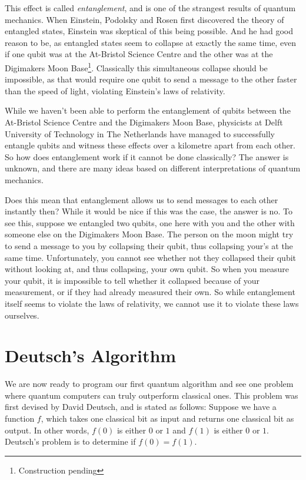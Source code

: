 \documentclass[twocolumn]{article}
\begin{document}
This effect is called {\em entanglement}, and is one of the strangest results of quantum mechanics. When Einstein, Podolsky and Rosen first discovered the theory of entangled states, Einstein was skeptical of this being possible. And he had good reason to be, as entangled states seem to collapse at exactly the same time, even if one qubit was at the At-Bristol Science Centre and the other was at the Digimakers Moon Base\footnote{Construction pending}. Classically this simultaneous collapse should be impossible, as that would require one qubit to send a message to the other faster than the speed of light, violating Einstein's laws of relativity.

While we haven't been able to perform the entanglement of qubits between the At-Bristol Science Centre and the Digimakers Moon Base, physicists at Delft University of Technology in The Netherlands have managed to successfully entangle qubits and witness these effects over a kilometre apart from each other. So how does entanglement work if it cannot be done classically? The answer is unknown, and there are many ideas based on different interpretations of quantum mechanics.

Does this mean that entanglement allows us to send messages to each other instantly then? While it would be nice if this was the case, the answer is no. To see this, suppose we entangled two qubits, one here with you and the other with someone else on the Digimakers Moon Base. The person on the moon might try to send a message to you by collapsing their qubit, thus collapsing your's at the same time. Unfortunately, you cannot see whether not they collapsed their qubit without looking at, and thus collapsing, your own qubit. So when you measure your qubit, it is impossible to tell whether it collapsed because of your measurement, or if they had already measured their own. So while entanglement itself seems to violate the laws of relativity, we cannot use it to violate these laws ourselves.

\section{Deutsch's Algorithm}

We are now ready to program our first quantum algorithm and see one problem where quantum computers can truly outperform classical ones. This problem was first devised by David Deutsch, and is stated as follows: Suppose we have a function $f$, which takes one classical bit as input and returns one classical bit as output. In other words, $f(0)$ is either $0$ or $1$ and $f(1)$ is either $0$ or $1$. Deutsch's problem is to determine if $f(0) = f(1)$.
\end{document}
